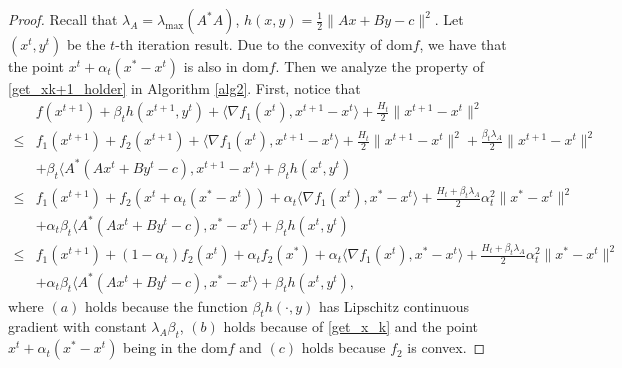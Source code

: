 \documentclass{article}
\numberwithin{equation}{section}
\begin{document}
\begin{proof}
    Recall that $\lambda_{A} = \lambda_{\max}(A^*A)$, $h(x,y) =\frac{1}{2}\|Ax+By-c\rVert^2$.  
    Let $(x^t,y^t)$ be the $t$-th iteration result. Due to the convexity of $\mathrm{dom}f$, 
    we have that the point $x^t + \alpha_t(x^*-x^t)$ is also in $\mathrm{dom}f$.   
    Then we  analyze the property of \eqref{get_xk+1_holder} in Algorithm \ref{alg2}. 
    First, notice that 
    \begin{align}
        &f(x^{t+1})+\beta_th(x^{t+1},y^t) +\langle \nabla f_1(x^t), x^{t+1}-x^t\rangle +\frac{H_t}{2}\|x^{t+1}-x^t\rVert^2 \nonumber \\
        \overset{\mathop{(a)}}{\leq} & f_1(x^{t+1})+f_2(x^{t+1}) +\langle \nabla f_1(x^t), x^{t+1}-x^t\rangle +\frac{H_t}{2}\|x^{t+1}-x^t\rVert^2 
        +\frac{\beta_t\lambda_A}{2}\| x^{t+1}-x^t\rVert^2 \nonumber \\
        &+\beta_t\langle A^*(Ax^t+By^t-c), x^{t+1}-x^t\rangle +\beta_th(x^t,y^t) \nonumber\\
        \overset{\mathop{(b)}}{\leq}& f_1(x^{t+1})+ f_2(x^t+\alpha_t(x^*-x^t)) +\alpha_t\langle \nabla f_1(x^t), x^*-x^t\rangle + 
        \frac{H_t+\beta_t\lambda_A}{2}\alpha_t^2\|x^*-x^t\rVert^2 \nonumber \\
        &+\alpha_t\beta_t\langle A^*(Ax^t+By^t-c), x^*-x^t\rangle + \beta_th(x^t,y^t) \nonumber \\
        \overset{\mathop{(c)}}{\leq} & f_1(x^{t+1})+ (1-\alpha_t)f_2(x^t)+\alpha_tf_2(x^*) +\alpha_t\langle \nabla f_1(x^t), x^*-x^t\rangle + 
        \frac{H_t+\beta_t\lambda_A}{2}\alpha_t^2\|x^*-x^t\rVert^2 \nonumber \\
        &+\alpha_t\beta_t\langle A^*(Ax^t+By^t-c), x^*-x^t\rangle + \beta_th(x^t,y^t), 
    \end{align}
    where $(a)$ holds because the function $\beta_th(\cdot,y)$ has Lipschitz continuous gradient with constant 
    $\lambda_A\beta_t$, $(b)$ holds because of \eqref{get_x_k} 
    and the point $x^t+\alpha_t(x^*-x^t)$ being in the $\mathrm{dom} f$ and $(c)$ holds because $f_2$ is convex.
    

\end{proof}
\end{document}

